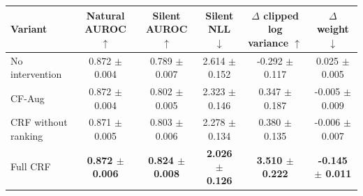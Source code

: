 \begin{tabular}{lccccc}
\toprule
Variant & Natural AUROC $\uparrow$ & Silent AUROC $\uparrow$ & Silent NLL $\downarrow$ & $\Delta$ clipped log variance $\uparrow$ & $\Delta$ weight $\downarrow$ \\
\midrule
No intervention & 0.872 $\pm$ 0.004 & 0.789 $\pm$ 0.007 & 2.614 $\pm$ 0.152 & -0.292 $\pm$ 0.117 & 0.025 $\pm$ 0.005 \\
CF-Aug & 0.872 $\pm$ 0.004 & 0.802 $\pm$ 0.005 & 2.323 $\pm$ 0.146 & 0.347 $\pm$ 0.187 & -0.005 $\pm$ 0.009 \\
CRF without ranking & 0.871 $\pm$ 0.005 & 0.803 $\pm$ 0.006 & 2.278 $\pm$ 0.134 & 0.380 $\pm$ 0.135 & -0.006 $\pm$ 0.007 \\
Full CRF & \textbf{0.872 $\pm$ 0.006} & \textbf{0.824 $\pm$ 0.008} & \textbf{2.026 $\pm$ 0.126} & \textbf{3.510 $\pm$ 0.222} & \textbf{-0.145 $\pm$ 0.011} \\
\bottomrule
\end{tabular}